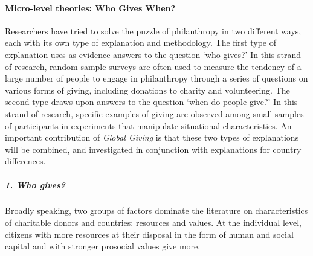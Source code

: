 \documentclass[twocolumn, serif, rga, numeric]{jote-article}
\begin{document}
\paragraph{Micro-level theories: Who Gives When?}

Researchers have tried to solve the puzzle of philanthropy in two different ways, each with its own type of explanation and methodology.
The first type of explanation uses as evidence answers to the question `who gives?' In this strand of research, random sample surveys are often used to measure the tendency of a large number of people to engage in philanthropy through a series of questions on various forms of giving, including donations to charity and volunteering. The second type draws upon answers to the question `when do people give?' In this strand of research, specific examples of giving are observed among small samples of participants in experiments that manipulate situational characteristics. An important contribution of \emph{Global Giving} is that these two types of explanations will be combined, and investigated in conjunction with explanations for country differences.

\subparagraph{1. Who gives?}

Broadly speaking, two groups of factors dominate the literature on characteristics of charitable donors and countries: resources and values. At the individual level, citizens with more resources at their disposal in the form of human and social capital and with stronger prosocial values give more.
\end{document}
